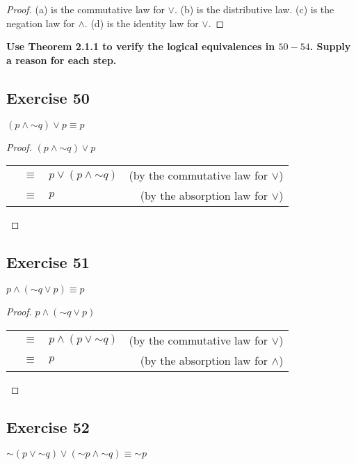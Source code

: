 \documentclass[14pt]{extarticle}
\begin{document}
\begin{proof}
    (a) is the commutative law for $\vee$. (b) is the distributive
    law. (c) is the negation law for $\wedge$. (d) is the identity law for $\vee$.
\end{proof}

{\bf Use Theorem 2.1.1 to verify the logical equivalences in $50-54$. Supply a reason for each step.}

\subsection{Exercise 50}
$(p \wedge {\sim q}) \vee p \equiv p$

\begin{proof}
    $(p \wedge {\sim q}) \vee p$
    \begin{tabular}{rclr}
         & $\equiv$ & $p \vee (p \wedge {\sim q})$ & (by the commutative law for $\vee$) \\
         & $\equiv$ & $p$                          & (by the absorption law for $\vee$)  \\
    \end{tabular}
\end{proof}

\subsection{Exercise 51}
$p \wedge ({\sim q} \vee p) \equiv p$

\begin{proof}
    $p \wedge ({\sim q} \vee p)$
    \begin{tabular}{rclr}
         & $\equiv$ & $p \wedge (p \vee {\sim q})$ & (by the commutative law for $\vee$)  \\
         & $\equiv$ & $p$                          & (by the absorption law for $\wedge$) \\
    \end{tabular}
\end{proof}

\subsection{Exercise 52}
${\sim (p \vee {\sim q})} \vee ({\sim p} \wedge {\sim q}) \equiv {\sim p}$
\end{document}
